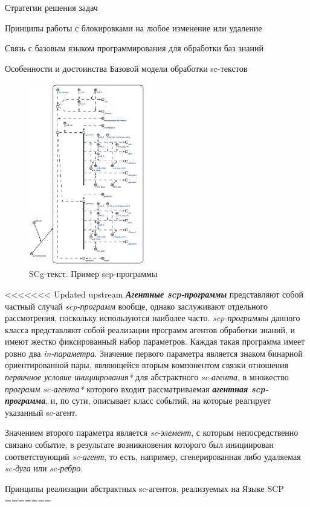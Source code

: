 \begin{frame}{Стратегии решения задач}
\begin{frame}{\large Принципы работы с блокировками на любое изменение или удаление}
\begin{frame}{Связь с базовым языком программирования для обработки баз
знаний}
\begin{frame}{Особенности и достоинства Базовой модели обработки sc-текстов}
\begin{frame}{}
\begin{figure}[H]
    \caption{SCg-текст. Пример scp-программы}
	\includegraphics[width=0.9\linewidth, height=8cm]{figures/sc-agents/program_example.png}
\end{figure}
\end{frame}

<<<<<<< Updated upstream
\textbf{\textit{Агентные scp-программы}} представляют собой частный случай \textit{scp-программ} вообще, однако заслуживают отдельного рассмотрения, поскольку используются наиболее часто. \textit{scp-программы} данного класса представляют собой реализации программ агентов обработки знаний, и имеют жестко фиксированный набор параметров. Каждая такая программа имеет ровно два \textit{in-параметра\scnrolesign}. Значение первого параметра является знаком бинарной ориентированной пары, являющейся вторым компонентом связки отношения \textit{первичное условие инициирования*} для абстрактного \textit{sc-агента}, в множество \textit{программ sc-агента*} которого входит рассматриваемая \textbf{\textit{агентная scp-программа}}, и, по сути, описывает класс событий, на которые реагирует указанный sc-агент.
	
Значением второго параметра является \textit{sc-элемент}, с которым непосредственно связано событие, в результате возникновения которого был инициирован соответствующий \textit{sc-агент}, то есть, например, сгенерированная либо удаляемая \textit{sc-дуга} или \textit{sc-ребро}.

\begin{frame}{\large Принципы реализации абстрактных sc-агентов, реализуемых на Языке SCP}
\vspace{15}
=======
\begin{frame}{}
\vspace{40}
 \\


\end{frame}
\end{frame}
\end{frame}
\end{frame}
\end{frame}
\end{frame}
